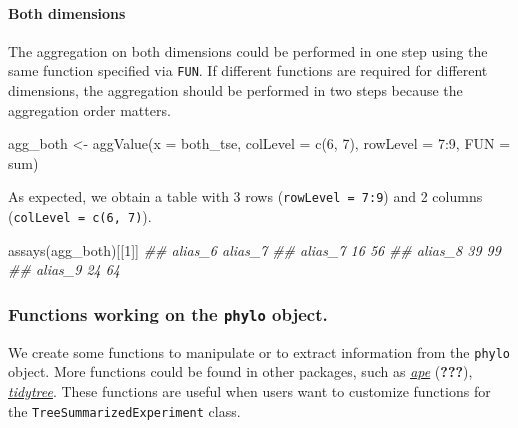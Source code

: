 \documentclass[]{article}
\newcommand{\hlnum}[1]{\textcolor[rgb]{0.816,0.125,0.439}{#1}}%
\newcommand{\hlstr}[1]{\textcolor[rgb]{0.251,0.627,0.251}{#1}}%
\newcommand{\hlcom}[1]{\textcolor[rgb]{0.502,0.502,0.502}{\textit{#1}}}%
\newcommand{\hlopt}[1]{\textcolor[rgb]{0,0,0}{#1}}%
\newcommand{\hlstd}[1]{\textcolor[rgb]{0.251,0.251,0.251}{#1}}%
\newcommand{\hlkwc}[1]{\textcolor[rgb]{0.251,0.251,0.251}{#1}}%
\newcommand{\hlkwd}[1]{\textcolor[rgb]{0.878,0.439,0.125}{#1}}%
\newenvironment{Shaded}{\begin{myshaded}}{\end{myshaded}}
\newcommand{\KeywordTok}[1]{\hlkwd{#1}}
\newcommand{\DataTypeTok}[1]{\hlkwc{#1}}
\newcommand{\DecValTok}[1]{\hlnum{#1}}
\newcommand{\StringTok}[1]{\hlstr{#1}}
\newcommand{\CommentTok}[1]{\hlcom{#1}}
\newcommand{\OperatorTok}[1]{\hlopt{#1}}
\newcommand{\NormalTok}[1]{\hlstd{#1}}
\begin{document}
\hypertarget{both-dimensions}{%
\paragraph{Both dimensions}\label{both-dimensions}}

The aggregation on both dimensions could be performed in one step using the same
function specified via \texttt{FUN}. If different functions are required for different
dimensions, the aggregation should be performed in two steps because the aggregation order matters.

\begin{Shaded}
\begin{Highlighting}[]
\NormalTok{agg_both <-}\StringTok{ }\KeywordTok{aggValue}\NormalTok{(}\DataTypeTok{x =}\NormalTok{ both_tse, }\DataTypeTok{colLevel =} \KeywordTok{c}\NormalTok{(}\DecValTok{6}\NormalTok{, }\DecValTok{7}\NormalTok{), }
                    \DataTypeTok{rowLevel =} \DecValTok{7}\OperatorTok{:}\DecValTok{9}\NormalTok{, }\DataTypeTok{FUN =}\NormalTok{ sum)}
\end{Highlighting}
\end{Shaded}

As expected, we obtain a table with 3 rows (\texttt{rowLevel = 7:9}) and 2 columns
(\texttt{colLevel = c(6, 7)}).

\begin{Shaded}
\begin{Highlighting}[]
\KeywordTok{assays}\NormalTok{(agg_both)[[}\DecValTok{1}\NormalTok{]]}
\CommentTok{##         alias_6 alias_7}
\CommentTok{## alias_7      16      56}
\CommentTok{## alias_8      39      99}
\CommentTok{## alias_9      24      64}
\end{Highlighting}
\end{Shaded}

\hypertarget{functions-working-on-the-phylo-object.}{%
\subsubsection{\texorpdfstring{Functions working on the \texttt{phylo} object.}{Functions working on the phylo object.}}\label{functions-working-on-the-phylo-object.}}

We create some functions to manipulate or to extract information
from the \texttt{phylo} object. More functions could be found in other packages, such
as \emph{\href{https://CRAN.R-project.org/package=ape}{ape}} ({\textbf{???}}), \emph{\href{https://CRAN.R-project.org/package=tidytree}{tidytree}}. These functions are
useful when users want to customize functions for the \texttt{TreeSummarizedExperiment}
class.
\end{document}
